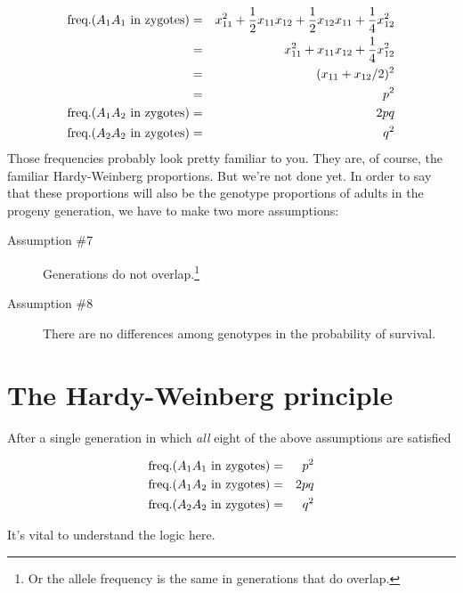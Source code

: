 \begin{eqnarray*}
\hbox{freq.}(A_1A_1\hbox{ in zygotes}) &=&
   x_{11}^2 + \frac{1}{2}x_{11}x_{12} + \frac{1}{2}x_{12}x_{11}
   + \frac{1}{4}x_{12}^2 \\
&=& x_{11}^2 + x_{11}x_{12} + \frac{1}{4}x_{12}^2 \\
&=& (x_{11} + x_{12}/2)^2 \\
&=& p^2 \\
\hbox{freq.}(A_1A_2\hbox{ in zygotes}) &=& 2pq \\
\hbox{freq.}(A_2A_2\hbox{ in zygotes}) &=& q^2 \\
\end{eqnarray*}
Those frequencies probably look pretty familiar to you. They are, of
course, the familiar Hardy-Weinberg proportions. But we're not done
yet. In order to say that these proportions will also be the genotype
proportions of adults in the progeny generation, we have to make two
more assumptions:

\begin{description}

\item[Assumption \#7] Generations do not overlap.\footnote{Or the
    allele frequency is the same in generations that do overlap.}

\item[Assumption \#8] There are no differences among genotypes in the
probability of survival.

\end{description}

\section*{The Hardy-Weinberg principle}

After a single generation in which {\it all\/} eight of the above
assumptions are satisfied

\begin{eqnarray}
\hbox{freq.}(A_1A_1\hbox{ in zygotes}) &=& p^2 \label{eq:hw-p2} \\
\hbox{freq.}(A_1A_2\hbox{ in zygotes}) &=& 2pq \label{eq:hw-2pq} \\
\hbox{freq.}(A_2A_2\hbox{ in zygotes}) &=& q^2 \label{eq:hw-q2}
\end{eqnarray}

\noindent It's vital to understand the logic here.

